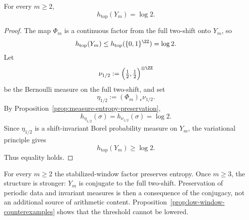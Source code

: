 \begin{corollary}\label{cor:entropy-preservation}
For every $m\ge 2$,
\[
h_{\mathrm{top}}(Y_m)=\log 2.
\]
\end{corollary}

\begin{proof}
The map $\Phi_m$ is a continuous factor from the full two-shift onto $Y_m$, so
\[
h_{\mathrm{top}}(Y_m)\le h_{\mathrm{top}}(\{0,1\}^{\ZZ})=\log 2.
\]
Let
\[
\nu_{1/2}:=\Bigl(\tfrac12,\tfrac12\Bigr)^{\otimes \ZZ}
\]
be the Bernoulli measure on the full two-shift, and set
\[
\eta_{1/2}:=(\Phi_m)_*\nu_{1/2}.
\]
By Proposition~\ref{prop:measure-entropy-preservation},
\[
h_{\eta_{1/2}}(\sigma)=h_{\nu_{1/2}}(\sigma)=\log 2.
\]
Since $\eta_{1/2}$ is a shift-invariant Borel probability measure on $Y_m$,
the variational principle \cite{Walters1982} gives
\[
h_{\mathrm{top}}(Y_m)\ge \log 2.
\]
Thus equality holds.
\end{proof}

\begin{remark}
For every $m\ge2$ the stabilized-window factor preserves entropy. Once
$m\ge3$, the structure is stronger: $Y_m$ is conjugate to the full two-shift.
Preservation of periodic data and invariant measures is then a consequence of
the conjugacy, not an additional source of arithmetic content.
Proposition~\ref{prop:low-window-counterexamples} shows that the threshold
cannot be lowered.
\end{remark}
